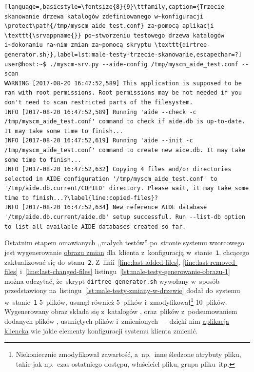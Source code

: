\documentclass[thesis]{subfiles}
\begin{document}
\begin{minipage}{\linewidth}
\begin{lstlisting}[language=,basicstyle=\fontsize{8}{9}\ttfamily,caption={Trzecie skanowanie drzewa katalogów zdefiniowanego w~konfiguracji \protect\path{/tmp/myscm_aide_test.conf} za~pomocą aplikacji \texttt{\srvappname{}} po~stworzeniu testowego drzewa katalogów i~dokonaniu na~nim zmian za~pomocą skryptu \texttt{dirtree-generator.sh}},label=lst:male-testy-trzecie-skanowanie,escapechar=?]
user@host:~$ ./myscm-srv.py --aide-config /tmp/myscm_aide_test.conf --scan
WARNING [2017-08-20 16:47:52,589] This application is supposed to be ran with root permissions. Root permissions may be not needed if you don't need to scan restricted parts of the filesystem.
INFO [2017-08-20 16:47:52,589] Running 'aide --check -c /tmp/myscm_aide_test.conf' command to check if aide.db is up-to-date. It may take some time to finish...
INFO [2017-08-20 16:47:52,619] Running 'aide --init -c /tmp/myscm_aide_test.conf' command to create new aide.db. It may take some time to finish...
INFO [2017-08-20 16:47:52,632] Copying 4 files and/or directories selected in AIDE configuration '/tmp/myscm_aide_test.conf' to '/tmp/aide.db.current/COPIED' directory. Please wait, it may take some time to finish...?\label{line:copied-files}?
INFO [2017-08-20 16:47:52,634] New reference AIDE database '/tmp/aide.db.current/aide.db' setup successful. Run --list-db option to list all available AIDE databases created so far.
\end{lstlisting}
\end{minipage}

Ostatnim etapem omawianych ,,małych testów'' po~stronie systemu wzorcowego jest wygenerowanie \hyperref[sec:obraz-zmian-konfiguracji]{obrazu zmian} dla~klienta z~konfiguracją w~stanie~\texttt{1}, chcącego zaktualizować się do~stanu~\texttt{2}. Z~linii~\ref{line:last-added-files}, \ref{line:last-removed-files} i~\ref{line:last-changed-files} listingu~\ref{lst:male-testy-generowanie-obrazu-1} można odczytać, że~skrypt \texttt{dirtree-generator.sh} wywołany w~sposób przedstawiony na~listingu~\ref{lst:male-testy-zmiany-w-drzewie} dodał do~systemu w~stanie~\texttt{1} 5~plików, usunął również 5~plików i~zmodyfikował\footnote{Niekoniecznie zmodyfikował zawartość, a~np.~inne śledzone atrybuty pliku, takie jak np.~czas ostatniego dostępu, właściciel pliku, grupa pliku~itp.} 10~plików. Wygenerowany obraz  składa się z~katalogów ,  oraz~plików z~podsumowaniem dodanych plików , usuniętych plików  i~zmienionych  --- dzięki nim \hyperref[sec:cli-app]{aplikacja kliencka} wie jakie elementy konfiguracji systemu klienta zmienić.
\end{document}
